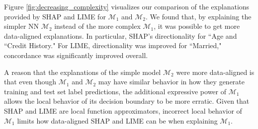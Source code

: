 \documentclass[mnsc,blindrev]{informs3}
\begin{document}
            Figure \ref{fig:decreasing_complexity} visualizes our comparison of the explanations provided by SHAP and LIME for $\mathcal{M}_1$ and $\mathcal{M}_2$. %
            We found that, by explaining the simpler NN $\mathcal{M}_2$ instead of the more complex $\mathcal{M}_1$, it was possible to get more data-aligned explanations. %
            In particular, SHAP's directionality for ``Age and ``Credit History."%
            For LIME, directionality was improved for ``Married," concordance was significantly improved overall.%

            
            
            A reason that the explanations of the simple model $\mathcal{M}_2$ were more data-aligned is that even though $\mathcal{M}_1$ and $\mathcal{M}_2$ may have similar behavior in how they generate training and test set label predictions, the additional expressive power of $\mathcal{M}_1$ allows the local behavior of its decision boundary to be more erratic. Given that SHAP and LIME are local function approximators, incorrect local behavior of $\mathcal{M}_1$ limits how data-aligned SHAP and LIME can be when explaining $\mathcal{M}_1$. 
\end{document}
